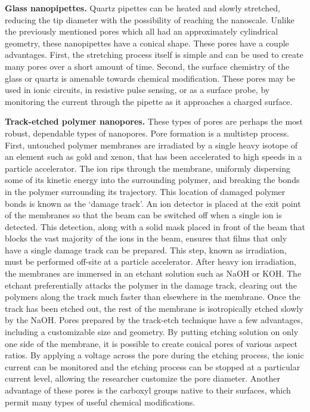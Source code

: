 \documentclass[a4paper,10pt]{article}
\theoremstyle{definition}
\theoremstyle{remark}
\begin{document}
\textbf{Glass nanopipettes.} Quartz pipettes can be heated and slowly stretched, reducing the tip diameter with the possibility of reaching the nanoscale. Unlike the previously mentioned pores which all had an approximately cylindrical geometry, these nanopipettes have a conical shape. These pores have a couple advantages. First, the stretching process itself is simple and can be used to create many pores over a short amount of time. Second, the surface chemistry of the glass or quartz is amenable towards chemical modification. These pores may be used in ionic circuits, in resistive pulse sensing, or as a surface probe, by monitoring the current through the pipette as it approaches a charged surface.

\textbf{Track-etched polymer nanopores.} These types of pores are perhaps the most robust, dependable types of nanopores. Pore formation is a multistep process. First, untouched polymer membranes are irradiated by a single heavy isotope of an element such as gold and xenon, that has been accelerated to high speeds in a particle accelerator. The ion rips through the membrane, uniformly dispersing some of its kinetic energy into the surrounding polymer, and breaking the bonds in the polymer surrounding its trajectory. This location of damaged polymer bonds is known as the `damage track'. An ion detector is placed at the exit point of the membranes so that the beam can be switched off when a single ion is detected. This detection, along with a solid mask placed in front of the beam that blocks the vast majority of the ions in the beam, ensures that films that only have a single damage track can be prepared. This step, known as irradiation, must be performed off-site at a particle accelerator. After heavy ion irradiation, the membranes are immersed in an etchant solution such as NaOH or KOH. The etchant preferentially attacks the polymer in the damage track, clearing out the polymers along the track much faster than elsewhere in the membrane. Once the track has been etched out, the rest of the membrane is isotropically etched slowly by the NaOH. Pores prepared by the track-etch technique have a few advantages, including a customizable size and geometry. By putting etching solution on only one side of the membrane, it is possible to create conical pores of various aspect ratios. By applying a voltage across the pore during the etching process, the ionic current can be monitored and the etching process can be stopped at a particular current level, allowing the researcher customize the pore diameter. Another advantage of these pores is the carboxyl groups native to their surfaces, which permit many types of useful chemical modifications.
\end{document}
